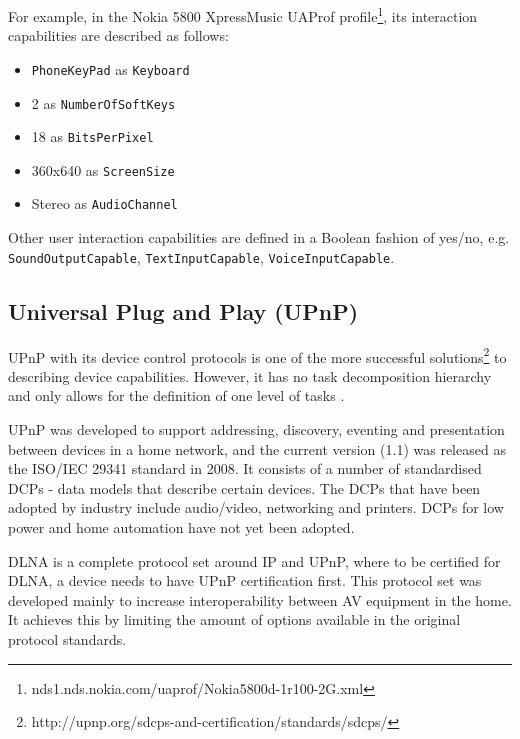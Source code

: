 
For example, in the Nokia 5800 XpressMusic UAProf profile\footnote{nds1.nds.nokia.com/uaprof/Nokia5800d-1r100-2G.xml
}, its interaction capabilities are described as follows:

\begin{itemize}
	\item \texttt{PhoneKeyPad} as \texttt{Keyboard}
	\item 2 as \texttt{NumberOfSoftKeys}
	\item 18 as \texttt{BitsPerPixel}
	\item 360x640 as \texttt{ScreenSize}
	\item Stereo as \texttt{AudioChannel}
\end{itemize}

Other user interaction capabilities are defined in a Boolean fashion of yes/no, e.g. \texttt{SoundOutputCapable}, \texttt{TextInputCapable}, \texttt{VoiceInputCapable}.

\subsection{Universal Plug and Play (UPnP)}
\label{UPnP}

\ac{UPnP} with its device control protocols is one of the more successful solutions\footnote{http://upnp.org/sdcps-and-certification/standards/sdcps/} to describing device capabilities. However, it has no task decomposition hierarchy and only allows for the definition of one level of tasks \cite{Niezen2010}.

\ac{UPnP} was developed to support addressing, discovery, eventing and presentation between devices in a home network, and the current version (1.1) was released as the ISO/IEC 29341 standard in 2008. It consists of a number of standardised \ac{DCP}s - data models that describe certain devices. The \ac{DCP}s that have been adopted by industry include audio/video, networking and printers. \ac{DCP}s for low power and home automation have not yet been adopted.

\ac{DLNA} is a complete protocol set around \ac{IP} and \ac{UPnP}, where to be certified for \ac{DLNA}, a device needs to have \ac{UPnP} certification first. This protocol set was developed mainly to increase interoperability between \ac{AV} equipment in the home. It achieves this by limiting the amount of options available in the original protocol standards.

